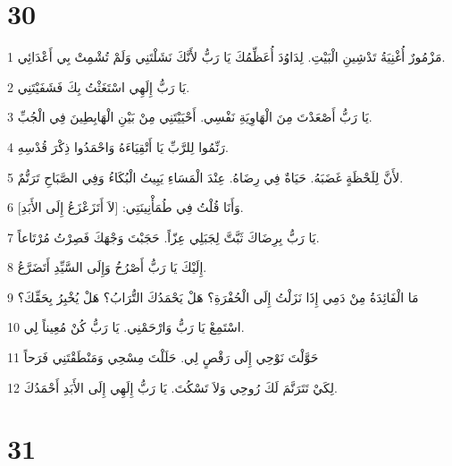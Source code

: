 \chapter{30}

\par 1 مَزْمُورٌ أُغْنِيَةُ تَدْشِينِ الْبَيْتِ. لِدَاوُدَ أُعَظِّمُكَ يَا رَبُّ لأَنَّكَ نَشَلْتَنِي وَلَمْ تُشْمِتْ بِي أَعْدَائِي.
\par 2 يَا رَبُّ إِلَهِي اسْتَغَثْتُ بِكَ فَشَفَيْتَنِي.
\par 3 يَا رَبُّ أَصْعَدْتَ مِنَ الْهَاوِيَةِ نَفْسِي. أَحْيَيْتَنِي مِنْ بَيْنِ الْهَابِطِينَ فِي الْجُبِّ.
\par 4 رَنِّمُوا لِلرَّبِّ يَا أَتْقِيَاءَهُ وَاحْمَدُوا ذِكْرَ قُدْسِهِ.
\par 5 لأَنَّ لِلَحْظَةٍ غَضَبَهُ. حَيَاةٌ فِي رِضَاهُ. عِنْدَ الْمَسَاءِ يَبِيتُ الْبُكَاءُ وَفِي الصَّبَاحِ تَرَنُّمٌ.
\par 6 وَأَنَا قُلْتُ فِي طُمَأْنِينَتِي: [لاَ أَتَزَعْزَعُ إِلَى الأَبَدِ].
\par 7 يَا رَبُّ بِرِضَاكَ ثَبَّتَّ لِجَبَلِي عِزّاً. حَجَبْتَ وَجْهَكَ فَصِرْتُ مُرْتَاعاً.
\par 8 إِلَيْكَ يَا رَبُّ أَصْرُخُ وَإِلَى السَّيِّدِ أَتَضَرَّعُ.
\par 9 مَا الْفَائِدَةُ مِنْ دَمِي إِذَا نَزَلْتُ إِلَى الْحُفْرَةِ؟ هَلْ يَحْمَدُكَ التُّرَابُ؟ هَلْ يُخْبِرُ بِحَقِّكَ؟
\par 10 اسْتَمِعْ يَا رَبُّ وَارْحَمْنِي. يَا رَبُّ كُنْ مُعِيناً لِي.
\par 11 حَوَّلْتَ نَوْحِي إِلَى رَقْصٍ لِي. حَلَلْتَ مِسْحِي وَمَنْطَقْتَنِي فَرَحاً
\par 12 لِكَيْ تَتَرَنَّمَ لَكَ رُوحِي وَلاَ تَسْكُتَ. يَا رَبُّ إِلَهِي إِلَى الأَبَدِ أَحْمَدُكَ.

\chapter{31}

